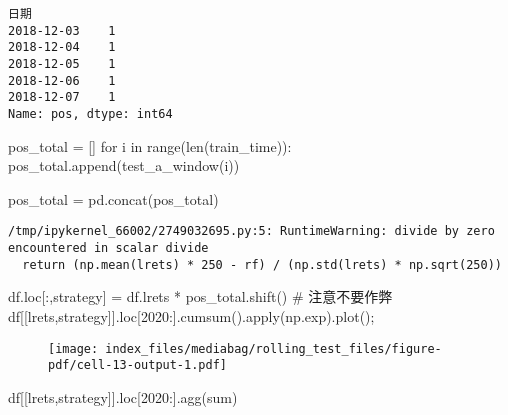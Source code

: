 \documentclass[
  letterpaper,
  DIV=11,
  numbers=noendperiod]{scrreprt}
\newenvironment{Shaded}{\begin{snugshade}}{\end{snugshade}}
\newcommand{\BuiltInTok}[1]{\textcolor[rgb]{0.00,0.23,0.31}{#1}}
\newcommand{\CommentTok}[1]{\textcolor[rgb]{0.37,0.37,0.37}{#1}}
\newcommand{\ControlFlowTok}[1]{\textcolor[rgb]{0.00,0.23,0.31}{#1}}
\newcommand{\KeywordTok}[1]{\textcolor[rgb]{0.00,0.23,0.31}{#1}}
\newcommand{\NormalTok}[1]{\textcolor[rgb]{0.00,0.23,0.31}{#1}}
\newcommand{\OperatorTok}[1]{\textcolor[rgb]{0.37,0.37,0.37}{#1}}
\newcommand{\StringTok}[1]{\textcolor[rgb]{0.13,0.47,0.30}{#1}}
\begin{document}
\begin{verbatim}
日期
2018-12-03    1
2018-12-04    1
2018-12-05    1
2018-12-06    1
2018-12-07    1
Name: pos, dtype: int64
\end{verbatim}

\begin{Shaded}
\begin{Highlighting}[]
\NormalTok{pos\_total }\OperatorTok{=}\NormalTok{ []}
\ControlFlowTok{for}\NormalTok{ i }\KeywordTok{in} \BuiltInTok{range}\NormalTok{(}\BuiltInTok{len}\NormalTok{(train\_time)):}
\NormalTok{    pos\_total.append(test\_a\_window(i))}

\NormalTok{pos\_total }\OperatorTok{=}\NormalTok{ pd.concat(pos\_total)}
\end{Highlighting}
\end{Shaded}

\begin{verbatim}
/tmp/ipykernel_66002/2749032695.py:5: RuntimeWarning: divide by zero encountered in scalar divide
  return (np.mean(lrets) * 250 - rf) / (np.std(lrets) * np.sqrt(250))
\end{verbatim}

\begin{Shaded}
\begin{Highlighting}[]
\NormalTok{df.loc[:,}\StringTok{\textquotesingle{}strategy\textquotesingle{}}\NormalTok{] }\OperatorTok{=}\NormalTok{ df.lrets }\OperatorTok{*}\NormalTok{ pos\_total.shift() }\CommentTok{\# 注意不要作弊}
\NormalTok{df[[}\StringTok{\textquotesingle{}lrets\textquotesingle{}}\NormalTok{,}\StringTok{\textquotesingle{}strategy\textquotesingle{}}\NormalTok{]].loc[}\StringTok{\textquotesingle{}2020\textquotesingle{}}\NormalTok{:].cumsum().}\BuiltInTok{apply}\NormalTok{(np.exp).plot()}\OperatorTok{;}
\end{Highlighting}
\end{Shaded}

\begin{figure}[H]

{\centering \texttt{[image: index\_files/mediabag/rolling\_test\_files/figure-pdf/cell-13-output-1.pdf]}

}

\end{figure}

\begin{Shaded}
\begin{Highlighting}[]
\NormalTok{df[[}\StringTok{\textquotesingle{}lrets\textquotesingle{}}\NormalTok{,}\StringTok{\textquotesingle{}strategy\textquotesingle{}}\NormalTok{]].loc[}\StringTok{\textquotesingle{}2020\textquotesingle{}}\NormalTok{:].agg(}\BuiltInTok{sum}\NormalTok{)}
\end{Highlighting}
\end{Shaded}
\end{document}
